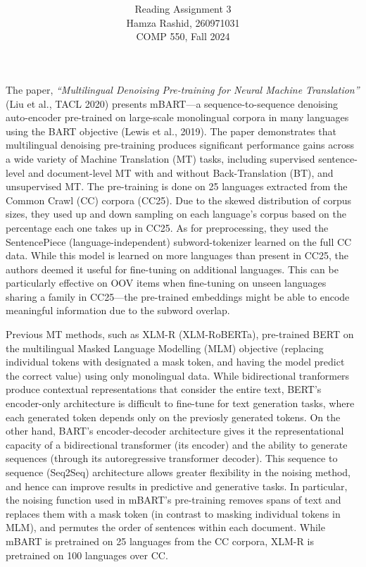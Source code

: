 \documentclass[11pt]{article}
\title{ }
\author{ Reading Assignment 3 \\ Hamza Rashid, 260971031 \\ COMP 550, Fall 2024}
\date{}
\begin{document}
\maketitle

\vspace{-5ex}
The paper, \textit{``Multilingual Denoising Pre-training for Neural Machine Translation''} (Liu et al., TACL 2020) 
presents mBART---a sequence-to-sequence denoising
auto-encoder pre-trained on large-scale monolingual corpora 
in many languages using the BART objective (Lewis et al., 2019). 
The paper demonstrates that multilingual
denoising pre-training produces significant 
performance gains across a wide variety of
Machine Translation (MT) tasks, including supervised
sentence-level and document-level MT 
with and without Back-Translation (BT), 
and unsupervised MT. The pre-training
is done on 25 languages extracted from the Common Crawl (CC) corpora (CC25).
Due to the skewed distribution of corpus sizes, they used up and down sampling on each language's corpus
based on the percentage each one takes up in CC25. As for preprocessing, they used the SentencePiece
(language-independent) subword-tokenizer learned on the full CC data. 
While this model is learned on more languages than present in CC25, 
the authors deemed it useful for fine-tuning on additional languages. 
This can be particularly effective on OOV items when fine-tuning on unseen languages
sharing a family in CC25---the pre-trained embeddings might be able to encode meaningful
information due to the subword overlap.



Previous MT methods, such as XLM-R (XLM-RoBERTa), pre-trained BERT on 
the multilingual Masked Language Modelling (MLM) objective (replacing individual tokens with designated a mask token, and having the model predict the correct value) using only
monolingual data. While bidirectional tranformers produce contextual representations that consider the entire text,
BERT's encoder-only architecture is difficult to fine-tune for text generation tasks, where each generated token depends only on the previosly generated tokens. 
On the other hand, BART's encoder-decoder architecture gives it the representational capacity of a bidirectional transformer (its encoder) and
the ability to generate sequences (through its autoregressive transformer decoder). 
This sequence to sequence (Seq2Seq) architecture allows greater flexibility in the noising method, and hence can improve results in predictive and generative tasks. 
In particular, the noising function used in mBART's pre-training removes
spans of text and replaces them with a mask token (in contrast to masking individual tokens in MLM), 
and permutes the order of sentences within each document. While mBART is pretrained on 25 languages from the CC corpora, XLM-R 
is pretrained on 100 languages over CC.
\end{document}
